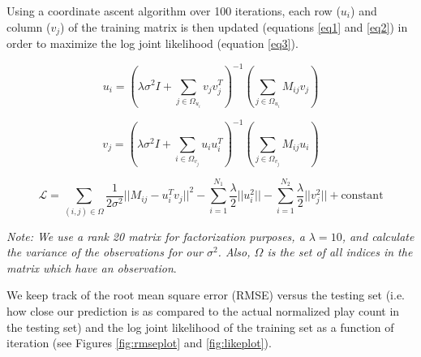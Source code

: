 \documentclass[12pt,preprint]{aastex}
\newcommand{\TRANSPOSE}{\ensuremath{T}}
\begin{document}
Using a coordinate ascent algorithm over 100 iterations, each row ($u_i$) and column ($v_j$) of the training matrix is then updated (equations \ref{eq1} and \ref{eq2}) in order to maximize the log joint likelihood (equation \ref{eq3}). 

\begin{equation}
u_i = \left( \lambda\sigma^2 I + \sum_{j \in \Omega_{u_i}} v_j v_j^\TRANSPOSE \right)^{-1}\left(\sum_{j \in \Omega_{u_i}} M_{ij} v_{j} \right)
\label{eq1}
\end{equation}

\begin{equation}
v_j = \left( \lambda\sigma^2 I + \sum_{i \in \Omega_{v_j}} u_i u_i^\TRANSPOSE  \right)^{-1}\left(\sum_{j \in \Omega_{v_j}} M_{ij} u_{i} \right)
\label{eq2}
\end{equation}

\begin{equation}
\mathcal{L} = \sum_{(i,j) \in \Omega} \frac{1}{2\sigma^2} {|| M_{ij} - u_i^\TRANSPOSE  v_j||}^2 - \sum_{i=1}^{N_1} \frac{\lambda}{2} ||u_i^2 || - \sum_{i=1}^{N_2} \frac{\lambda}{2} ||v_j^2 || + \text{constant}
\label{eq3} 
\end{equation}

\emph{Note: We use a rank 20 matrix for factorization purposes, a $\lambda = 10$, and calculate the variance of the observations for our $\sigma^2$. Also, $\Omega$ is the set of all indices in the matrix which have an observation}.

We keep track of the root mean square error (RMSE) versus the testing set (i.e. how close our prediction is as compared to the actual normalized play count in the testing set) and the log joint likelihood of the training set as a function of iteration (see Figures \ref{fig:rmseplot} and \ref{fig:likeplot}).


%
\end{document}

